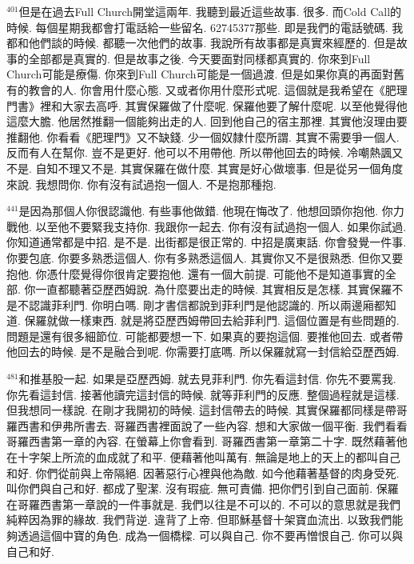 \documentclass{book}
\begin{document}
$^{401}$但是在過去Full Church開堂這兩年.
我聽到最近這些故事.
很多.
而Cold Call的時候.
每個星期我都會打電話給一些留名.
62745377那些.
即是我們的電話號碼.
我都和他們談的時候.
都聽一次他們的故事.
我說所有故事都是真實來經歷的.
但是故事的全部都是真實的.
但是故事之後.
今天要面對同樣都真實的.
你來到Full Church可能是療傷.
你來到Full Church可能是一個過渡.
但是如果你真的再面對舊有的教會的人.
你會用什麼心態.
又或者你用什麼形式呢.
這個就是我希望在《肥理門書》裡和大家去高呼.
其實保羅做了什麼呢.
保羅他要了解什麼呢.
以至他覺得他這麼大膽.
他居然推翻一個能夠出走的人.
回到他自己的宿主那裡.
其實他沒理由要推翻他.
你看看《肥理門》又不缺錢.
少一個奴隸什麼所謂.
其實不需要爭一個人.
反而有人在幫你.
豈不是更好.
他可以不用帶他.
所以帶他回去的時候.
冷嘲熱諷又不是.
自知不理又不是.
其實保羅在做什麼.
其實是好心做壞事.
但是從另一個角度來說.
我想問你.
你有沒有試過抱一個人.
不是抱那種抱.

$^{441}$是因為那個人你很認識他.
有些事他做錯.
他現在悔改了.
他想回頭你抱他.
你力戰他.
以至他不要緊我支持你.
我跟你一起去.
你有沒有試過抱一個人.
如果你試過.
你知道通常都是中招.
是不是.
出街都是很正常的.
中招是廣東話.
你會發覺一件事.
你要包底.
你要多熟悉這個人.
你有多熟悉這個人.
其實你又不是很熟悉.
但你又要抱他.
你憑什麼覺得你很肯定要抱他.
還有一個大前提.
可能他不是知道事實的全部.
你一直都聽著亞歷西姆說.
為什麼要出走的時候.
其實相反是怎樣.
其實保羅不是不認識菲利門.
你明白嗎.
剛才書信都說到菲利門是他認識的.
所以兩邊廂都知道.
保羅就做一樣東西.
就是將亞歷西姆帶回去給菲利門.
這個位置是有些問題的.
問題是還有很多細節位.
可能都要想一下.
如果真的要抱這個.
要推他回去.
或者帶他回去的時候.
是不是融合到呢.
你需要打底嗎.
所以保羅就寫一封信給亞歷西姆.

$^{481}$和推基股一起.
如果是亞歷西姆.
就去見菲利門.
你先看這封信.
你先不要罵我.
你先看這封信.
接著他讀完這封信的時候.
就等菲利門的反應.
整個過程就是這樣.
但我想同一樣說.
在剛才我開初的時候.
這封信帶去的時候.
其實保羅都同樣是帶哥羅西書和伊弗所書去.
哥羅西書裡面說了一些內容.
想和大家做一個平衡.
我們看看哥羅西書第一章的內容.
在螢幕上你會看到.
哥羅西書第一章第二十字.
既然藉著他在十字架上所流的血成就了和平.
便藉著他叫萬有.
無論是地上的天上的都叫自己和好.
你們從前與上帝隔絕.
因著惡行心裡與他為敵.
如今他藉著基督的肉身受死.
叫你們與自己和好.
都成了聖潔.
沒有瑕疵.
無可責備.
把你們引到自己面前.
保羅在哥羅西書第一章說的一件事就是.
我們以往是不可以的.
不可以的意思就是我們純粹因為罪的緣故.
我們背逆.
違背了上帝.
但耶穌基督十架寶血流出.
以致我們能夠透過這個中寶的角色.
成為一個橋樑.
可以與自己.
你不要再憎恨自己.
你可以與自己和好.
\end{document}
